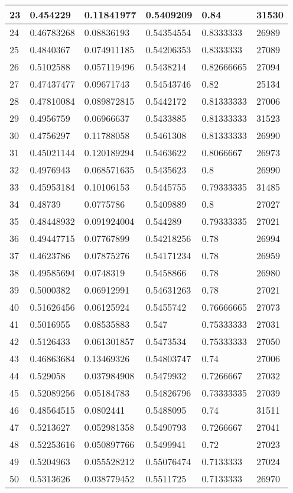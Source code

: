\begin{longtable}{|l|l|l|l|l|l|}
23 & 0.454229 & 0.11841977 & 0.5409209 & 0.84 & 31530 \\ \hline 
24 & 0.46783268 & 0.08836193 & 0.54354554 & 0.8333333 & 26989 \\ \hline 
25 & 0.4840367 & 0.074911185 & 0.54206353 & 0.8333333 & 27089 \\ \hline 
26 & 0.5102588 & 0.057119496 & 0.5438214 & 0.82666665 & 27094 \\ \hline 
27 & 0.47437477 & 0.09671743 & 0.54543746 & 0.82 & 25134 \\ \hline 
28 & 0.47810084 & 0.089872815 & 0.5442172 & 0.81333333 & 27006 \\ \hline 
29 & 0.4956759 & 0.06966637 & 0.5433885 & 0.81333333 & 31523 \\ \hline 
30 & 0.4756297 & 0.11788058 & 0.5461308 & 0.81333333 & 26990 \\ \hline 
31 & 0.45021144 & 0.120189294 & 0.5463622 & 0.8066667 & 26973 \\ \hline 
32 & 0.4976943 & 0.068571635 & 0.5435623 & 0.8 & 26990 \\ \hline 
33 & 0.45953184 & 0.10106153 & 0.5445755 & 0.79333335 & 31485 \\ \hline 
34 & 0.48739 & 0.0775786 & 0.5409889 & 0.8 & 27027 \\ \hline 
35 & 0.48448932 & 0.091924004 & 0.544289 & 0.79333335 & 27021 \\ \hline 
36 & 0.49447715 & 0.07767899 & 0.54218256 & 0.78 & 26994 \\ \hline 
37 & 0.4623786 & 0.07875276 & 0.54171234 & 0.78 & 26959 \\ \hline 
38 & 0.49585694 & 0.0748319 & 0.5458866 & 0.78 & 26980 \\ \hline 
39 & 0.5000382 & 0.06912991 & 0.54631263 & 0.78 & 27021 \\ \hline 
40 & 0.51626456 & 0.06125924 & 0.5455742 & 0.76666665 & 27073 \\ \hline 
41 & 0.5016955 & 0.08535883 & 0.547 & 0.75333333 & 27031 \\ \hline 
42 & 0.5126433 & 0.061301857 & 0.5473534 & 0.75333333 & 27050 \\ \hline 
43 & 0.46863684 & 0.13469326 & 0.54803747 & 0.74 & 27006 \\ \hline 
44 & 0.529058 & 0.037984908 & 0.5479932 & 0.7266667 & 27032 \\ \hline 
45 & 0.52089256 & 0.05184783 & 0.54826796 & 0.73333335 & 27039 \\ \hline 
46 & 0.48564515 & 0.0802441 & 0.5488095 & 0.74 & 31511 \\ \hline 
47 & 0.5213627 & 0.052981358 & 0.5490793 & 0.7266667 & 27041 \\ \hline 
48 & 0.52253616 & 0.050897766 & 0.5499941 & 0.72 & 27023 \\ \hline 
49 & 0.5204963 & 0.055528212 & 0.55076474 & 0.7133333 & 27024 \\ \hline 
50 & 0.5313626 & 0.038779452 & 0.5511725 & 0.7133333 & 26970 \\ \hline 
\end{longtable}